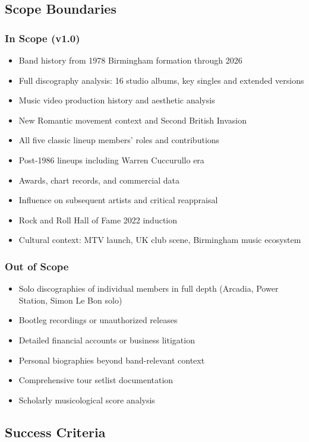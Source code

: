 \documentclass[11pt,letterpaper]{article}
\begin{document}
\subsection{Scope Boundaries}

\subsubsection{In Scope (v1.0)}
\begin{itemize}
  \item Band history from 1978 Birmingham formation through 2026
  \item Full discography analysis: 16 studio albums, key singles and extended versions
  \item Music video production history and aesthetic analysis
  \item New Romantic movement context and Second British Invasion
  \item All five classic lineup members' roles and contributions
  \item Post-1986 lineups including Warren Cuccurullo era
  \item Awards, chart records, and commercial data
  \item Influence on subsequent artists and critical reappraisal
  \item Rock and Roll Hall of Fame 2022 induction
  \item Cultural context: MTV launch, UK club scene, Birmingham music ecosystem
\end{itemize}

\subsubsection{Out of Scope}
\begin{itemize}
  \item Solo discographies of individual members in full depth (Arcadia, Power Station, Simon Le Bon solo)
  \item Bootleg recordings or unauthorized releases
  \item Detailed financial accounts or business litigation
  \item Personal biographies beyond band-relevant context
  \item Comprehensive tour setlist documentation
  \item Scholarly musicological score analysis
\end{itemize}

\subsection{Success Criteria}
\end{document}

